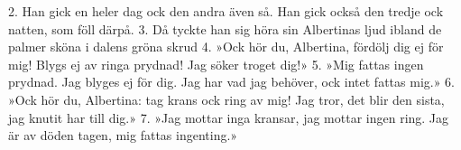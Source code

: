 2.  Han gick en heler dag
    ock den andra även så.
    Han gick också den tredje
    ock natten, som föll därpå.
3.  Då tyckte han sig höra
    sin Albertinas ljud
    ibland de palmer sköna
    i dalens gröna skrud
4.  »Ock hör du, Albertina,
    fördölj dig ej för mig!
    Blygs ej av ringa prydnad!
    Jag söker troget dig!»
5.  »Mig fattas ingen prydnad.
    Jag blyges ej för dig.
    Jag har vad jag behöver,
    ock intet fattas mig.»
6.  »Ock hör du, Albertina:
    tag krans ock ring av mig!
    Jag tror, det blir den sista,
    jag knutit har till dig.»
7.  »Jag mottar inga kransar,
    jag mottar ingen ring.
    Jag är av döden tagen,
    mig fattas ingenting.»

